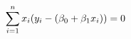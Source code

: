 \documentclass[preview]{standalone}
\begin{document}
\begin{align*}
\special{dvisvgm:raw <g id='unique000'>}\sum_{i=1}^n{x_i(y_i-(\beta_0+\beta_1 x_i)})=0\special{dvisvgm:raw </g>}
\end{align*}
\end{document}
